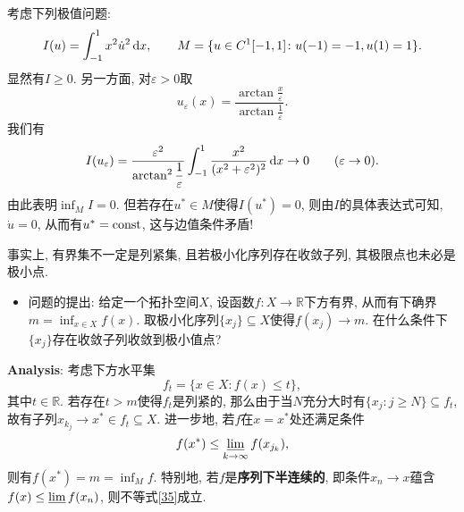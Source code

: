 \begin{example}
    考虑下列极值问题:
    \begin{equation*}
        I(u) = \int_{-1}^1x^2\dot u^2 \,{\rm d}x, \qquad M = \{u \in C^1[-1, 1]\colon u(-1) = -1, u(1) = 1\}.
    \end{equation*}
    显然有$I \geq 0$. 另一方面, 对$\varepsilon > 0$取 
    \begin{equation*}
        u_{\varepsilon}(x) = \frac{\arctan \displaystyle\frac{x}{\varepsilon}}{\arctan \displaystyle\frac{1}{\varepsilon}}.
    \end{equation*}
    我们有 
    \begin{equation*}
        I(u_{\varepsilon}) = \frac{\varepsilon^2}{\arctan^2\displaystyle\frac{1}{\varepsilon}}\int_{-1}^1\frac{x^2}{(x^2 + \varepsilon^2)^2} \,{\rm d}x \rightarrow 0 \qquad (\varepsilon \rightarrow 0).
    \end{equation*}
    由此表明$\inf_MI = 0$. 但若存在$u^* \in M$使得$I(u^*) = 0$, 则由$I$的具体表达式可知, $\dot u = 0$, 从而有$u^* = {\rm const}$, 这与边值条件矛盾!
\end{example}

事实上, 有界集不一定是列紧集, 且若极小化序列存在收敛子列, 其极限点也未必是极小点.

\begin{itemize}
    \item 问题的提出: 给定一个拓扑空间$X$, 设函数$f\colon X \rightarrow \mathbb{R}$下方有界, 从而有下确界$m = \inf_{x \in X}f(x)$.
    取极小化序列$\{x_j\} \subseteq X$使得$f(x_j) \rightarrow m$. 在什么条件下$\{x_j\}$存在收敛子列收敛到极小值点?    
\end{itemize}

\textbf{Analysis}: 考虑下方水平集 
\begin{equation*}
    f_t = \{x \in X\colon f(x) \leq t\},
\end{equation*}
其中$t \in \mathbb{R}$. 若存在$t > m$使得$f_t$是列紧的, 那么由于当$N$充分大时有$\{x_j\colon j \geq N\} \subseteq f_t$, 故有子列$x_{k_j} \rightarrow x^* \in f_t \subseteq X$. 
进一步地, 若$f$在$x = x^*$处还满足条件 
\begin{equation}\label{35}
    f(x^*) \leq \varliminf\limits_{k \rightarrow \infty}f(x_{j_k}),
\end{equation}
则有$f(x^*) = m = \inf_Mf$. 特别地, 若$f$是\textbf{序列下半连续的}, 即条件$x_n \rightarrow x$蕴含$f(x) \leq \varliminf f(x_n)$, 则不等式\eqref{35}成立.

